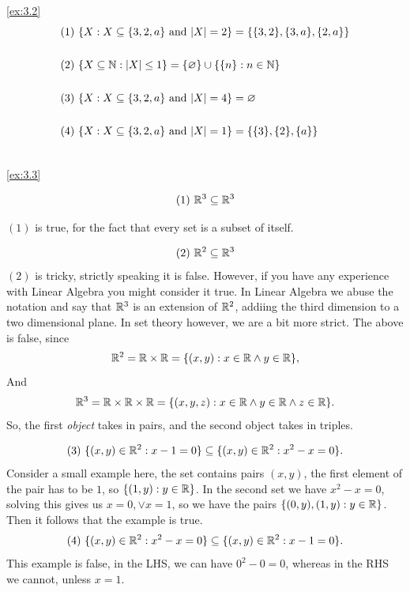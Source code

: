\begin{solution}\label{sol:3.2}\ref{ex:3.2}
    $$
    \begin{aligned}
    &(1)~\{ X:X\subseteq \{ 3,2,a \}\text{ and } \lvert X \rvert=2 \}=\{ \{ 3,2 \},\{ 3,a \},\{ 2,a \} \}\\\\
    &(2)~\{ X\subseteq\mathbb{N}:\lvert X \rvert\le 1 \}=\{ \varnothing \}\cup \{ \{ n \}:n\in\mathbb{N} \}\\\\
    &(3)~\{ X:X\subseteq \{ 3,2,a \}\text{ and }\lvert X \rvert=4 \}=\varnothing\\\\
    &(4)~\{ X:X\subseteq \{ 3,2,a \}\text{ and }\lvert X \rvert=1 \}=\{ \{ 3 \},\{ 2 \},\{ a \} \}\\\\
    \end{aligned}
    $$ 
   \end{solution}

\begin{solution}\label{sol:3.3}\ref{ex:3.3}
   
   $$
   (1)~\mathbb{R}^3\subseteq\mathbb{R}^3
   $$

   $(1)$ is true, for the fact that every set is a subset of itself. 
   
   $$
   (2)~\mathbb{R}^2\subseteq\mathbb{R}^3
   $$
   $(2)$ is tricky, strictly speaking it is false. However, if you have any experience with Linear Algebra you might consider it true. In Linear Algebra we abuse the notation and say that $\mathbb{R}^3$ is an extension of $\mathbb{R}^2$, addiing the third dimension to a two dimensional plane. In set theory however, we are a bit more strict. The above is false, since 
   $$
   \mathbb{R}^2=\mathbb{R}\times\mathbb{R}=\{ (x,y):x\in \mathbb{R}\land y\in\mathbb{R} \},
   $$
   And 
   $$
   \mathbb{R}^3=\mathbb{R}\times\mathbb{R}\times\mathbb{R}=\{ (x,y,z):x\in\mathbb{R}\land y\in\mathbb{R} \land z\in\mathbb{R} \}.
   $$
   So, the first \emph{object} takes in pairs, and the second object takes in triples. 

   $$
   (3)~\{ (x,y)\in\mathbb{R}^2:x-1=0 \}\subseteq \{ (x,y)\in\mathbb{R}^2:x^2-x=0 \}.
   $$
   Consider a small example here, the set contains pairs $(x,y)$, the first element of the pair has to be $1$, so $\{ (1,y):y\in\mathbb{R} \}$. In the second set we have $x^2-x=0$, solving this gives us $x=0,\lor x=1$, so we have the pairs $\{ (0,y),(1,y):y\in\mathbb{R} \}$. Then it follows that the example is true. 
   $$
   (4)~\{ (x,y)\in\mathbb{R}^2:x^2-x=0 \}\subseteq \{ (x,y)\in\mathbb{R}^2:x-1=0 \}.
   $$
   This example is false, in the LHS, we can have $0^2-0=0$, whereas in the RHS we cannot, unless $x=1$.  
\end{solution}